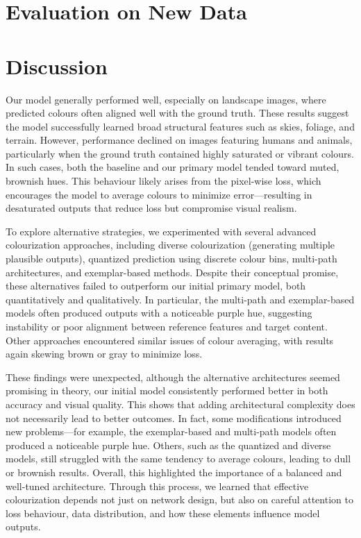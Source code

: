 \documentclass{article} %
\begin{document}
\section{Evaluation on New Data}
\label{new_data}

\section{Discussion}
\label{discussion}

Our model generally performed well, especially on landscape images, where predicted colours often aligned well with the ground truth. These results suggest the model successfully
learned broad structural features such as skies, foliage, and terrain. However, performance declined on images featuring humans and animals, particularly when the ground truth
contained highly saturated or vibrant colours. In such cases, both the baseline and our primary model tended toward muted, brownish hues. This behaviour likely arises from the
pixel-wise loss, which encourages the model to average colours to minimize error—resulting in desaturated outputs that reduce loss but compromise visual realism.

To explore alternative strategies, we experimented with several advanced colourization approaches, including diverse colourization (generating multiple plausible outputs),
quantized prediction using discrete colour bins, multi-path architectures, and exemplar-based methods. Despite their conceptual promise, these alternatives failed to outperform
our initial primary model, both quantitatively and qualitatively. In particular, the multi-path and exemplar-based models often produced outputs with a noticeable purple hue, 
suggesting instability or poor alignment between reference features and target content. Other approaches encountered similar issues of colour averaging, with results again skewing 
brown or gray to minimize loss.

These findings were unexpected, although the alternative architectures seemed promising in theory, our initial model consistently performed better in both accuracy and visual quality. 
This shows that adding architectural complexity does not necessarily lead to better outcomes. In fact, some modifications introduced new problems—for example, the exemplar-based and 
multi-path models often produced a noticeable purple hue. Others, such as the quantized and diverse models, still struggled with the same tendency to average colours, leading to dull 
or brownish results. Overall, this highlighted the importance of a balanced and well-tuned architecture. Through this process, we learned that effective colourization depends not just 
on network design, but also on careful attention to loss behaviour, data distribution, and how these elements influence model outputs.
\end{document}
